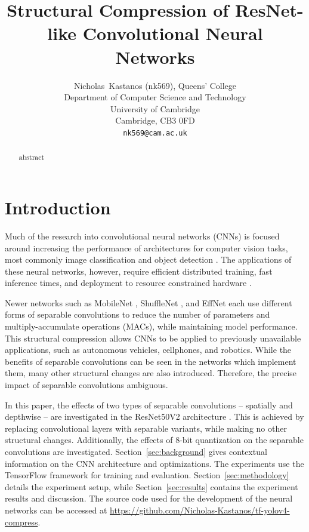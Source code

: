 \documentclass{article}
\title{Structural Compression of ResNet-like Convolutional Neural Networks}
\author{%
	Nicholas~Kastanos (nk569), Queens' College \\
	Department of Computer Science and Technology\\
	University of Cambridge\\
	Cambridge, CB3 0FD\\
	\texttt{nk569@cam.ac.uk} \\
}
\begin{document}
	
	\maketitle
	
	\begin{abstract}
		abstract
	\end{abstract}
	
	\section{Introduction}
	
	Much of the research into convolutional neural networks (CNNs) is focused around increasing the performance of architectures for computer vision tasks, most commonly image classification and object detection \cite{resnetv1, vgg, yolo, inception, adscnet}. The applications of these neural networks, however, require efficient distributed training, fast inference times, and deployment to resource constrained hardware \cite{scalable8bit,mobilenet}. 
	
	Newer networks such as MobileNet \cite{mobilenet}, ShuffleNet \cite{shufflenet}, and EffNet \cite{effnet} each use different forms of separable convolutions to reduce the number of parameters and multiply-accumulate operations (MACs), while maintaining model performance. This structural compression allows CNNs to be applied to previously unavailable applications, such as autonomous vehicles, cellphones, and robotics.	While the benefits of separable convolutions can be seen in the networks which implement them, many other structural changes are also introduced. Therefore, the precise impact of separable convolutions ambiguous.
	
	In this paper, the effects of two types of separable convolutions -- spatially and depthwise -- are investigated in the ResNet50V2 architecture \cite{resnetv2}. This is achieved by replacing convolutional layers with separable variants, while making no other structural changes. Additionally, the effects of 8-bit quantization on the separable convolutions are investigated. Section~\ref{sec:background} gives contextual information on the CNN architecture and optimizations. The experiments use the TensorFlow framework \cite{tensorflow2015-whitepaper} for training and evaluation. Section~\ref{sec:methodology} details the experiment setup, while Section~\ref{sec:results} contains the experiment results and discussion. The source code used for the development of the neural networks can be accessed at \url{https://github.com/Nicholas-Kastanos/tf-yolov4-compress}.
		
\end{document}
